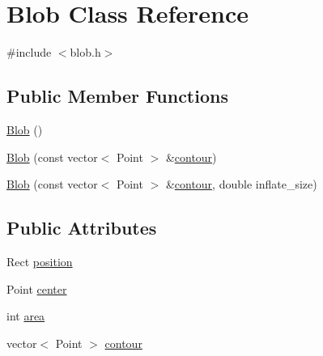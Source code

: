 \hypertarget{class_blob}{
\section{Blob Class Reference}
\label{class_blob}
}


{\ttfamily \#include $<$blob.h$>$}

\subsection*{Public Member Functions}
\begin{DoxyCompactItemize}
\item 
\hyperlink{class_blob_a6a0d29e3183e1458d1b9e6a5ca584826}{Blob} ()
\item 
\hyperlink{class_blob_a3b184a0014375ffe79cabc2acf385b36}{Blob} (const vector$<$ Point $>$ \&\hyperlink{class_blob_a605d60a2ed8812901ede80e75822ce34}{contour})
\item 
\hyperlink{class_blob_a9149d5db7849d239af4b3c6924edc1c5}{Blob} (const vector$<$ Point $>$ \&\hyperlink{class_blob_a605d60a2ed8812901ede80e75822ce34}{contour}, double inflate\_\-size)
\end{DoxyCompactItemize}
\subsection*{Public Attributes}
\begin{DoxyCompactItemize}
\item 
Rect \hyperlink{class_blob_a3b0e9ce257ffc2df3d7ba41a863c2c10}{position}
\item 
Point \hyperlink{class_blob_a55f346db1ac5b462f4f21837fa684131}{center}
\item 
int \hyperlink{class_blob_ab4518ab5ca61c304ea4bc2cdb9caa32f}{area}
\item 
vector$<$ Point $>$ \hyperlink{class_blob_a605d60a2ed8812901ede80e75822ce34}{contour}
\end{DoxyCompactItemize}


